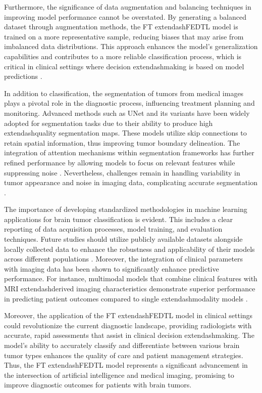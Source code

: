 \documentclass[runningheads]{llncs}
\begin{document}
Furthermore, the significance of data augmentation and balancing techniques in improving model performance cannot be overstated. By generating a balanced dataset through augmentation methods, the FT	extendash{}FEDTL model is trained on a more representative sample, reducing biases that may arise from imbalanced data distributions. This approach enhances the model's generalization capabilities and contributes to a more reliable classification process, which is critical in clinical settings where decision	extendash{}making is based on model predictions \cite{Kashfia_2023}.

In addition to classification, the segmentation of tumors from medical images plays a pivotal role in the diagnostic process, influencing treatment planning and monitoring. Advanced methods such as UNet and its variants have been widely adopted for segmentation tasks due to their ability to produce high	extendash{}quality segmentation maps. These models utilize skip connections to retain spatial information, thus improving tumor boundary delineation. The integration of attention mechanisms within segmentation frameworks has further refined performance by allowing models to focus on relevant features while suppressing noise \cite{Longfeng_2023}. Nevertheless, challenges remain in handling variability in tumor appearance and noise in imaging data, complicating accurate segmentation \cite{Istiak_2024}.

The importance of developing standardized methodologies in machine learning applications for brain tumor classification is evident. This includes a clear reporting of data acquisition processes, model training, and evaluation techniques. Future studies should utilize publicly available datasets alongside locally collected data to enhance the robustness and applicability of their models across different populations \cite{Chun_2025}. Moreover, the integration of clinical parameters with imaging data has been shown to significantly enhance predictive performance. For instance, multimodal models that combine clinical features with MRI	extendash{}derived imaging characteristics demonstrate superior performance in predicting patient outcomes compared to single	extendash{}modality models \cite{Tomoki_2024}.

Moreover, the application of the FT	extendash{}FEDTL model in clinical settings could revolutionize the current diagnostic landscape, providing radiologists with accurate, rapid assessments that assist in clinical decision	extendash{}making. The model's ability to accurately classify and differentiate between various brain tumor types enhances the quality of care and patient management strategies. Thus, the FT	extendash{}FEDTL model represents a significant advancement in the intersection of artificial intelligence and medical imaging, promising to improve diagnostic outcomes for patients with brain tumors.
\end{document}

